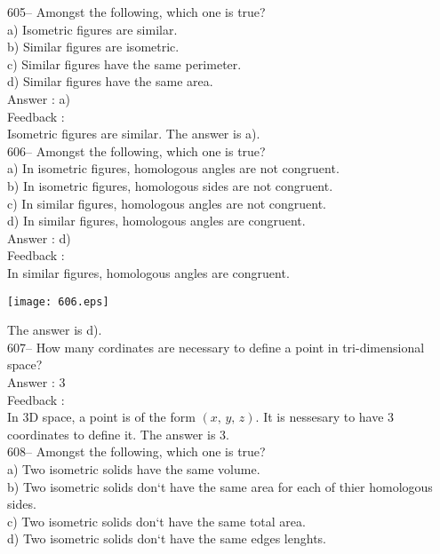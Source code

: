 \documentclass[letterpaper, 12pt]{article}
\begin{document}
605-- Amongst the following, which one is true?\\
a) Isometric figures are similar.\\
b) Similar figures are isometric.\\
c) Similar figures have the same perimeter.\\
d) Similar figures have the same area.\\

Answer : a)\\

Feedback : \\
Isometric figures are similar.  The answer is a).\\

606-- Amongst the following, which one is true?\\
a) In isometric figures, homologous angles are not congruent.\\
b) In isometric figures, homologous sides are not congruent.\\
c) In similar figures, homologous angles are not congruent.\\
d) In similar figures, homologous angles are congruent.\\

Answer : d)\\

Feedback : \\
In similar figures, homologous angles are congruent.
\begin{center}
    \texttt{[image: 606.eps]}
    \end{center}  The answer is d).\\

607-- How many cordinates are necessary to define a point in tri-dimensional space?\\

Answer : 3\\

Feedback : \\
In 3D space, a point is of the form $\left(x,\,y,\,z\right) $. It is nessesary to have 3 coordinates to define it. The answer is 3. \\

608-- Amongst the following, which one is true?\\
a) Two isometric solids have the same volume.\\
b) Two isometric solids don`t have the same area for each of thier homologous sides.\\
c) Two isometric solids don`t have the same total area.\\
d) Two isometric solids don`t have the same edges lenghts.\\
\end{document}
